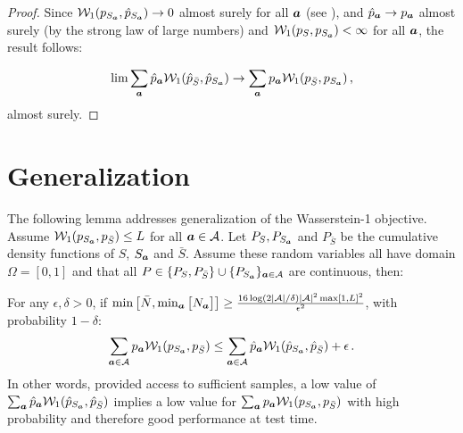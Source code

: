 \documentclass[letterpaper]{article}
\theoremstyle{definition}
\newcommand{\W}{\mathcal{W}}
\newcommand{\bS}{\bar{S}}
\begin{document}
\begin{proof}
Since $\W_1(p_{S_\va}, \hat{p}_{S_{\va}})\rightarrow 0$ almost surely for all ${\bm{a}}$ (see \cite{weed17sharp}), and $\hat{p}_{{\bm{a}}} \rightarrow p_{{{\bm{a}}}}$ almost surely (by the strong law of large numbers) and $\W_1(p_{S}, p_{S_{\va}} ) < \infty$ for all ${\bm{a}}$, the result follows:

\begin{equation*}
\lim \sum_{\va} \hat{p}_{{\va}} \W_1(\hat{p}_{\bS}, \hat{p}_{S_\va}) \rightarrow \sum_{\va} p_{\va}\W_1(p_{\bS}, p_{S_\va})\,, 
\end{equation*}
almost surely.
\end{proof}

\section{Generalization}
The following lemma addresses generalization of the Wasserstein-1 objective. Assume $\W_1(p_{S_\va}, p_{\bS}) \leq L$ for all ${\bm{a}}\in \mathcal{A}$. Let $P_S, P_{S_{\bm{a}}}$ and $P_{\bS}$ be the cumulative density functions of $S$, $S_{\bm{a}}$ and $\bS$. Assume these random variables all have domain $\Omega = [0,1]$ and that all $P \in \{  P_S, P_{\bS}\} \cup \{  P_{S_\va}\}_{\va \in \mathcal{A}}$ are continuous, then:

\setcounter{lemma}{4}
\begin{lemma}\label{lemma:was_gen} 
For any $\epsilon, \delta > 0$, if %
$\min\big[\bar{N}, \min_{{\bm{a}}}\big[N_{\bm{a}}\big]\big]\geq  \frac{16\log(2|\mathcal{A}|/\delta)|\mathcal{A}|^2\max[1, L]^2}{\epsilon^2}$, with probability $1-\delta$:
\begin{equation*}
    \sum_{\va \in \mathcal{A}} p_{\va} \W_1(p_{S_{\va}}, p_{\bS})  
    \leq \sum_{\va \in \mathcal{A}} \hat{p}_{\va} \W_1(\hat{p}_{S_\va},\hat{p}_{\bS}) + \epsilon\,.
\end{equation*}
In other words, provided access to sufficient samples, a low value of $\sum_{\va} \hat{p}_{\va} \W_1(\hat{p}_{S_\va}, \hat{p}_{\bS})$ implies a low value for $\sum_{\va} p_{\va} \W_1(p_{S_\va}, p_{\bS}) $ with high probability and therefore good performance at test time. 
\end{lemma}
\end{document}
